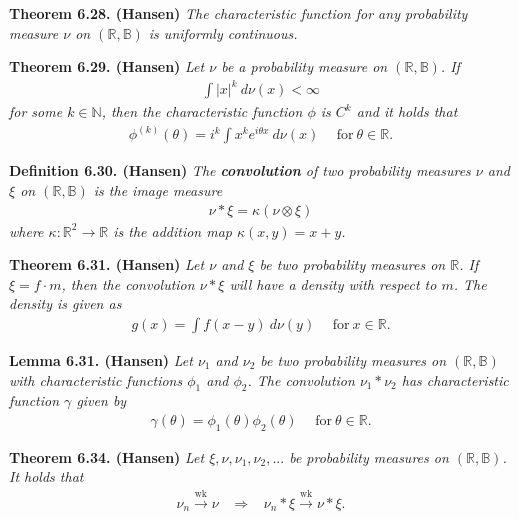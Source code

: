 \documentclass[
]{book}
\begin{document}
\textbf{Theorem 6.28. (Hansen)} \emph{The characteristic function for any probability measure \(\nu\) on \((\mathbb{R},\mathbb{B})\) is uniformly continuous.}

\textbf{Theorem 6.29. (Hansen)} \emph{Let \(\nu\) be a probability measure on \((\mathbb{R},\mathbb{B})\). If}
\begin{align*}
    \int \vert x\vert^k\ d\nu(x)<\infty
\end{align*}
\emph{for some \(k\in\mathbb{N}\), then the characteristic function \(\phi\) is \(C^k\) and it holds that}
\begin{align*}
    \phi^{(k)}(\theta)=i^k\int x^ke^{i\theta x}\ d\nu(x)\hspace{15pt}\text{for}\ \theta\in\mathbb{R}.\tag{6.31}
\end{align*}

\textbf{Definition 6.30. (Hansen)} \emph{The \textbf{convolution} of two probability measures \(\nu\) and \(\xi\) on \((\mathbb{R},\mathbb{B})\) is the image measure}
\begin{align*}
    \nu * \xi=\kappa (\nu\otimes\xi)\tag{6.33}
\end{align*}
\emph{where \(\kappa : \mathbb{R}^2\to\mathbb{R}\) is the addition map \(\kappa(x,y)=x+y\).}

\textbf{Theorem 6.31. (Hansen)} \emph{Let \(\nu\) and \(\xi\) be two probability measures on \(\mathbb{R}\). If \(\xi=f\cdot m\), then the convolution \(\nu*\xi\) will have a density with respect to \(m\). The density is given as}
\begin{align*}
    g(x)=\int f(x-y)\ d\nu(y)\hspace{15pt}\text{for}\ x\in\mathbb{R}.\tag{6.35}
\end{align*}

\textbf{Lemma 6.31. (Hansen)} \emph{Let \(\nu_1\) and \(\nu_2\) be two probability measures on \((\mathbb{R},\mathbb{B})\) with characteristic functions \(\phi_1\) and \(\phi_2\). The convolution \(\nu_1*\nu_2\) has characteristic function \(\gamma\) given by}
\begin{align*}
    \gamma(\theta)=\phi_1(\theta)\phi_2(\theta)\hspace{15pt}\text{for}\ \theta\in\mathbb{R}.\tag{6.37}
\end{align*}

\textbf{Theorem 6.34. (Hansen)} \emph{Let \(\xi,\nu,\nu_1,\nu_2,...\) be probability measures on \((\mathbb{R},\mathbb{B})\). It holds that}
\begin{align*}
    \nu_n\stackrel{\text{wk}}{\to} \nu\hspace{10pt}\Rightarrow\hspace{10pt} \nu_n*\xi\stackrel{\text{wk}}{\to} \nu *\xi.
\end{align*}
\end{document}
